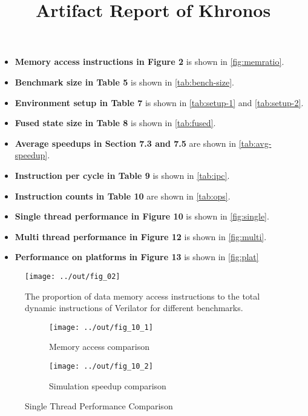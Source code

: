 \documentclass{sig-alternate}
\title{Artifact Report of Khronos}
\begin{document}
\maketitle

\begin{itemize}[noitemsep,topsep=0pt]
  \item {\bf Memory access instructions in Figure 2} is shown in \autoref{fig:memratio}.
  \item {\bf Benchmark size in Table 5} is shown in \autoref{tab:bench-size}.
  \item {\bf Environment setup in Table 7} is shown in \autoref{tab:setup-1} and \autoref{tab:setup-2}.
  \item {\bf Fused state size in Table 8} is shown in \autoref{tab:fused}.
  \item {\bf Average speedups in Section 7.3 and 7.5} are shown in \autoref{tab:avg-speedup}.
  \item {\bf Instruction per cycle in Table 9} is shown in \autoref{tab:ipc}.
  \item {\bf Instruction counts in Table 10} are shown in \autoref{tab:ops}.
  \item {\bf Single thread performance in Figure 10} is shown in \autoref{fig:single}.
  \item {\bf Multi thread performance in Figure 12} is shown in \autoref{fig:multi}.
  \item {\bf Performance on platforms in Figure 13} is shown in \autoref{fig:plat}
\end{itemize}

\begin{figure}[h!]
  \centering
  \texttt{[image: ../out/fig\_02]}
  \vspace*{-4mm}
  \caption{The proportion of data memory access instructions to the total dynamic instructions of Verilator for different benchmarks.}
  \label{fig:memratio}
\end{figure}










\begin{figure*}[h!]
  \centering
  \begin{subfigure}{\linewidth}
    \centering
    \caption{Memory access comparison}
    \texttt{[image: ../out/fig\_10\_1]}
  \end{subfigure}
  \begin{subfigure}{\linewidth}
    \centering
    \caption{Simulation speedup comparison}
    \texttt{[image: ../out/fig\_10\_2]}
  \end{subfigure}
  \vspace*{-5mm}
  \caption{Single Thread Performance Comparison}
  \label{fig:single}
\end{figure*}
\end{document}
